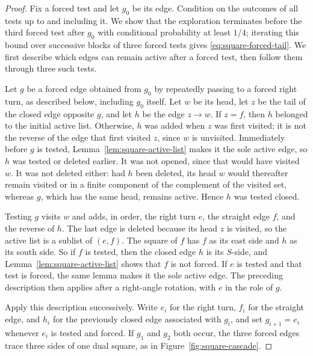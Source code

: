 \documentclass[11pt]{amsart}
\theoremstyle{plain}
\theoremstyle{definition}
\begin{document}
	\begin{proof}
		Fix a forced test and let $g_0$ be its edge.  Condition on the outcomes of all
		tests up to and including it.  We show that the exploration terminates before
		the third forced test after $g_0$ with conditional probability at least $1/4$;
		iterating this bound over successive blocks of three forced tests gives
		\eqref{eq:square-forced-tail}.  We first describe which edges can remain active
		after a forced test, then follow them through three such tests.
		
		Let $g$ be a forced edge obtained from $g_0$ by repeatedly passing to a forced
		right turn, as described below, including $g_0$ itself.  Let $w$ be its head, let $z$ be the tail of the closed
		edge opposite $g$, and let $h$ be the edge $z\to w$.  If $z=f$, then $h$
		belonged to the initial active list.  Otherwise, $h$ was added when $z$ was
		first visited; it is not the reverse of the edge that first visited $z$, since $w$
		is unvisited.  Immediately before $g$ is tested,
		Lemma~\ref{lem:square-active-list} makes it the sole active edge, so $h$ was
		tested or deleted earlier.  It was not opened, since that would have visited
		$w$.  It was not deleted either: had $h$ been deleted, its head $w$ would
		thereafter remain visited or in a finite component of the complement of the
		visited set, whereas $g$, which has the same head, remains active.  Hence $h$
		was tested closed.

		Testing $g$ visits $w$ and adds, in order, the right turn $e$, the straight edge
		$f$, and the reverse of $h$.  The last edge is deleted because its head $z$ is
		visited, so the active list is a sublist of $(e,f)$.  The square of $f$ has $f$ as its east side and $h$
		as its south side.  So if $f$ is tested, then the closed edge $h$ is its
		$S$-side, and Lemma~\ref{lem:square-active-list} shows that $f$ is not forced.  If $e$ is tested and that test is forced, the same lemma
		makes it the sole active edge.  The preceding description then applies after a
		right-angle rotation, with $e$ in the role of $g$.

		Apply this description successively.  Write $e_i$ for the right turn, $f_i$ for
		the straight edge, and $h_i$ for the previously closed edge associated with
		$g_i$, and set $g_{i+1}=e_i$ whenever $e_i$ is tested and forced.  If $g_1$ and
		$g_2$ both occur, the three forced edges trace three sides of one dual square,
		as in Figure~\ref{fig:square-cascade}.
		

\end{proof}
\end{document}
